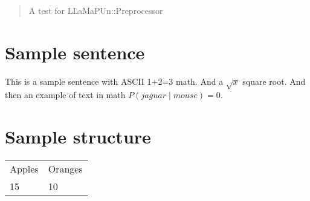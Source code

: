 \documentclass{article}
\begin{document}
\begin{abstract}A test for LLaMaPUn::Preprocessor\end{abstract}
\section{Sample sentence}
This is a sample sentence with ASCII 1+2=3 math. And a $\sqrt{x}$ square root.
And then an example of text in math $P(jaguar\mid mouse)=0$.
\section{Sample structure}
\begin{tabular}{ll}
Apples & Oranges \\
15 & 10 \\
\end{tabular}
\end{document}
